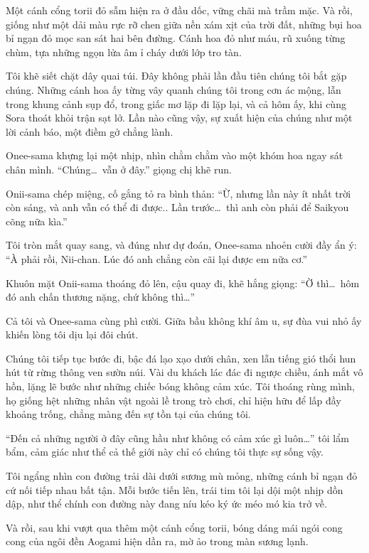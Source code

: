 \documentclass[../main.tex]{subfiles}
\begin{document}
Một cánh cổng torii đỏ sẫm hiện ra ở đầu dốc, vững chãi mà trầm mặc. Và rồi, giống như một dải màu rực rỡ chen giữa nền xám xịt của trời đất, những bụi hoa bỉ ngạn đỏ mọc san sát hai bên đường. Cánh hoa đỏ như máu, rũ xuống từng chùm, tựa những ngọn lửa âm ỉ cháy dưới lớp tro tàn.

Tôi khẽ siết chặt dây quai túi. Đây không phải lần đầu tiên chúng tôi bắt gặp chúng. Những cánh hoa ấy từng vây quanh chúng tôi trong cơn ác mộng, lẫn trong khung cảnh sụp đổ, trong giấc mơ lặp đi lặp lại, và cả hôm ấy, khi cùng Sora thoát khỏi trận sạt lở. Lần nào cũng vậy, sự xuất hiện của chúng như một lời cảnh báo, một điềm gở chẳng lành.

Onee-sama khựng lại một nhịp, nhìn chằm chằm vào một khóm hoa ngay sát chân mình. ``Chúng\dots\ vẫn ở đây.'' giọng chị khẽ run.

Onii-sama chép miệng, cố gắng tỏ ra bình thản: ``Ừ, nhưng lần này ít nhất trời còn sáng, và anh vẫn có thể đi được.. Lần trước\dots\ thì anh còn phải để Saikyou cõng nữa kìa.''

Tôi tròn mắt quay sang, và đúng như dự đoán, Onee-sama nhoẻn cười đầy ẩn ý: ``À phải rồi, Nii-chan. Lúc đó anh chẳng còn cãi lại được em nữa cơ.''

Khuôn mặt Onii-sama thoáng đỏ lên, cậu quay đi, khẽ hắng giọng: ``Ờ thì\dots\ hôm đó anh chấn thương nặng, chứ không thì\dots''

Cả tôi và Onee-sama cùng phì cười. Giữa bầu không khí âm u, sự đùa vui nhỏ ấy khiến lòng tôi dịu lại đôi chút.

Chúng tôi tiếp tục bước đi, bậc đá lạo xạo dưới chân, xen lẫn tiếng gió thổi hun hút từ rừng thông ven sườn núi. Vài du khách lác đác đi ngược chiều, ánh mắt vô hồn, lặng lẽ bước như những chiếc bóng không cảm xúc. Tôi thoáng rùng mình, họ giống hệt những nhân vật ngoài lề trong trò chơi, chỉ hiện hữu để lấp đầy khoảng trống, chẳng màng đến sự tồn tại của chúng tôi.

``Đến cả những người ở đây cũng hầu như không có cảm xúc gì luôn\dots'' tôi lẩm bẩm, cảm giác như thể cả thế giới này chỉ có chúng tôi thực sự sống vậy.

Tôi ngẩng nhìn con đường trải dài dưới sương mù mỏng, những cánh bỉ ngạn đỏ cứ nối tiếp nhau bất tận. Mỗi bước tiến lên, trái tim tôi lại dội một nhịp dồn dập, như thể chính con đường này đang níu kéo ký ức méo mó kia trở về.

Và rồi, sau khi vượt qua thêm một cánh cổng torii, bóng dáng mái ngói cong cong của ngôi đền Aogami hiện dần ra, mờ ảo trong màn sương lạnh.
\end{document}

